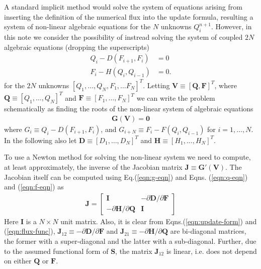 \documentclass[11pt]{article}
\newcommand{\eqr}[1]{Eq.\thinspace(#1)}
\newcommand{\pfracb}[2]{\partial #1/\partial #2}
\newcommand{\mvec}[1]{\mathbf{#1}}
\newcommand{\gvec}[1]{\boldsymbol{#1}}
\begin{document}
A standard implicit method would solve the system of equations arising
from inserting the definition of the numerical flux into the update
formula, resulting a system of non-linear algebraic equations for the
$N$ unknowns $Q_i^{n+1}$. However, in this note we consider the
possibility of instread solving the system of coupled $2N$ algebraic
equations (dropping the superscripts)
\begin{align}
  Q_i - D(F_{i+1}, F_i) &= 0  \label{eqn:q-eqn} \\
  F_i - H(Q_i, Q_{i-1}) &= 0. \label{eqn:f-eqn}
\end{align}
for the $2N$ unknowns $[Q_1, \ldots, Q_N, F_1, \ldots F_N
]^T$. Letting $\mvec{V} \equiv [\mvec{Q}, \mvec{F}]^T$, where
$\mvec{Q} \equiv [Q_1, \ldots, Q_N]^T$ and $\mvec{F} \equiv [F_1,
\ldots, F_N]^T$ we can write the problem schematically as finding the
roots of the non-linear system of algebraic equations
\begin{align}
  \mvec{G}(\mvec{V}) = \mvec{0} \label{eqn:g-eqn}
\end{align}
where $G_i \equiv Q_i - D(F_{i+1}, F_i)$, and $G_{i+N} \equiv F_i -
F(Q_i, Q_{i-1})$ for $i=1,\ldots,N$. In the following also let
$\mvec{D} \equiv [D_1,\ldots,D_N]^T$ and $\gvec{H} \equiv
[H_1,\ldots,H_N]^T$.

To use a Newton method for solving the non-linear system we need to
compute, at least approximately, the inverse of the Jacobian matrix
$\mvec{J} \equiv \mvec{G}'(\mvec{V})$. The Jacobian itself can be
computed using \eqr{\ref{eqn:g-eqn}} and Eqns.\thinspace
(\ref{eqn:q-eqn}) and (\ref{eqn:f-eqn}) as
\begin{align}
  \mvec{J} =
  \left[
    \begin{array}{cc}
      \mvec{I} & -\pfracb{\mvec{D}}{\mvec{F}} \\
      -\pfracb{\mvec{H}}{\mvec{Q}} & \mvec{I}
    \end{array}
  \right]
\end{align}
Here $\mvec{I}$ is a $N\times N$ unit matrix. Also, it is clear from
Eqns.\thinspace (\ref{eqn:update-form}) and (\ref{eqn:flux-func}),
$\mvec{J}_{12} \equiv -\pfracb{\mvec{D}}{\mvec{F}}$ and $
\mvec{J}_{21} \equiv -\pfracb{\mvec{H}}{\mvec{Q}}$ are bi-diagonal
matrices, the former with a super-diagonal and the latter with a
sub-diagonal. Further, due to the assumed functional form of
$\mvec{S}$, the matrix $\mvec{J}_{12}$ is linear, i.e. does not depend
on either $\mvec{Q}$ or $\mvec{F}$.
\end{document}
